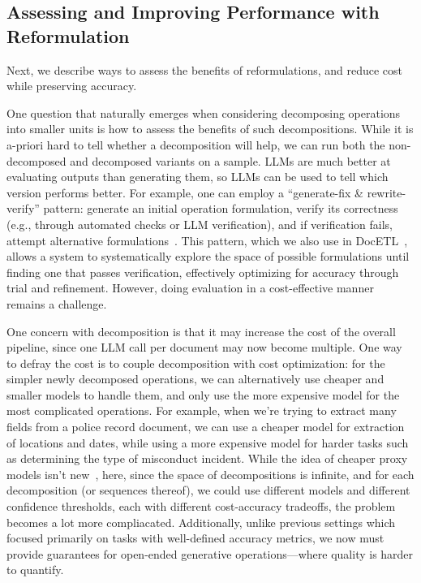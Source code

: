 \subsection{Assessing and Improving Performance with Reformulation}
Next, we describe ways to 
assess the benefits of reformulations,
and reduce cost while preserving accuracy. 

One question that naturally emerges when considering
decomposing operations into smaller units
is how to assess the benefits of such decompositions.
While it is a-priori hard to tell whether
a decomposition will help, we can run
both the non-decomposed and decomposed
variants on a sample. 
LLMs are much better at evaluating outputs
than generating them, so LLMs can be used
to tell which version performs better.
For example, 
one can employ a ``generate-fix \& rewrite-verify'' pattern: 
generate an initial operation formulation, 
verify its correctness (e.g., through automated checks or LLM 
verification), and if verification fails, attempt alternative 
formulations~\cite{chung2025long}. 
This pattern, 
which we also use in DocETL~\cite{shankar2024docetl}, 
allows a system to systematically explore the space of possible 
formulations until finding one 
that passes verification, effectively optimizing for accuracy 
through trial and refinement.
However, doing evaluation in a cost-effective manner remains
a challenge. 





One concern with decomposition is that
it may increase the cost of the overall pipeline,
since one LLM call per document may now become
multiple. 
One way to defray the cost is to couple decomposition
with cost optimization:
for the simpler newly decomposed operations,
we can alternatively use cheaper and smaller
models to handle them, and only use the more expensive model 
for the most complicated operations.
For example, when we're trying to extract many fields
from a police record document, we can use a cheaper
model for extraction of locations and dates, while using
a more expensive model for harder tasks such as
determining the type of misconduct incident.
While the idea of cheaper proxy models isn't new~\cite{kang2017noscope, patel2024lotus},
here, since the space of decompositions is infinite,
and for each decomposition (or sequences thereof), 
we could use different
models and different confidence thresholds, each with 
different cost-accuracy tradeoffs, the problem
becomes a lot more compliacated.
Additionally, unlike previous settings which focused primarily on 
tasks with well-defined accuracy metrics, we now must provide 
guarantees for open-ended generative operations---where quality 
is harder to quantify.

